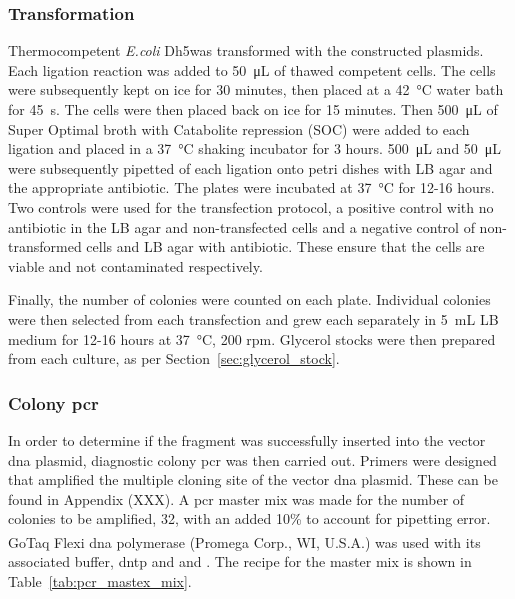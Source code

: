 \subsubsection{Transformation}
\label{sec:transfection}
Thermocompetent \textit{E.coli} Dh5\textalpha was transformed with the constructed plasmids. Each ligation reaction was added to \SI{50}{\micro\liter} of thawed competent cells. The cells were subsequently kept on ice for 30 minutes, then placed at a \SI{42}{\celsius} water bath for \SI{45}{\second}. The cells were then placed back on ice for 15 minutes. Then \SI{500}{\micro\liter} of Super Optimal broth with Catabolite repression (SOC) were added to each ligation and placed in a \SI{37}{\celsius} shaking incubator for 3 hours. \SI{500}{\micro\liter} and \SI{50}{\micro\liter} were subsequently pipetted of each ligation onto petri dishes with LB agar and the appropriate antibiotic. The plates were incubated at \SI{37}{\celsius} for 12-16 hours. Two controls were used for the transfection protocol, a positive control with no antibiotic in the LB agar and non-transfected cells and a negative control of non-transformed cells and LB agar with antibiotic. These ensure that the cells are viable and not contaminated respectively. 

Finally, the number of colonies were counted on each plate. Individual colonies were then selected from each transfection and grew each separately in \SI{5}{\milli\liter} LB medium for 12-16 hours at \SI{37}{\celsius}, 200 rpm. Glycerol stocks were then prepared from each culture, as per Section~\ref{sec:glycerol_stock}.



\subsubsection{Colony \acrshort{pcr}}

In order to determine if the fragment was successfully inserted into the vector \acrshort{dna} plasmid, diagnostic colony \acrshort{pcr} was then carried out. Primers were designed that amplified the multiple cloning site of the vector \acrshort{dna} plasmid. These can be found in Appendix (XXX). A \acrshort{pcr} master mix was made for the number of colonies to be amplified, 32, with an added 10\% to account for pipetting error. GoTaq\textsuperscript{\textregistered} Flexi \acrshort{dna} polymerase (Promega Corp., WI, U.S.A.) was used with its associated buffer, \acrshort{dntp} and and . The recipe for the master mix is shown in Table~\ref{tab:pcr_mastex_mix}.

